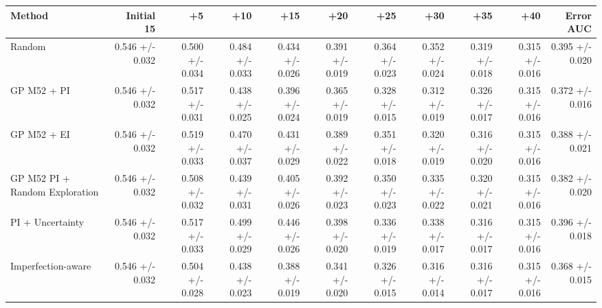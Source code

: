 \begin{tabular}{lrrrrrrrrrr}
\toprule
Method & Initial 15 & +5 & +10 & +15 & +20 & +25 & +30 & +35 & +40 & Error AUC \\
\midrule
Random & 0.546 +/- 0.032 & 0.500 +/- 0.034 & 0.484 +/- 0.033 & 0.434 +/- 0.026 & 0.391 +/- 0.019 & 0.364 +/- 0.023 & 0.352 +/- 0.024 & 0.319 +/- 0.018 & 0.315 +/- 0.016 & 0.395 +/- 0.020 \\
GP M52 + PI & 0.546 +/- 0.032 & 0.517 +/- 0.031 & 0.438 +/- 0.025 & 0.396 +/- 0.024 & 0.365 +/- 0.019 & 0.328 +/- 0.015 & 0.312 +/- 0.019 & 0.326 +/- 0.017 & 0.315 +/- 0.016 & 0.372 +/- 0.016 \\
GP M52 + EI & 0.546 +/- 0.032 & 0.519 +/- 0.033 & 0.470 +/- 0.037 & 0.431 +/- 0.029 & 0.389 +/- 0.022 & 0.351 +/- 0.018 & 0.320 +/- 0.019 & 0.316 +/- 0.020 & 0.315 +/- 0.016 & 0.388 +/- 0.021 \\
GP M52 PI + Random Exploration & 0.546 +/- 0.032 & 0.508 +/- 0.032 & 0.439 +/- 0.031 & 0.405 +/- 0.026 & 0.392 +/- 0.023 & 0.350 +/- 0.023 & 0.335 +/- 0.022 & 0.320 +/- 0.021 & 0.315 +/- 0.016 & 0.382 +/- 0.020 \\
PI + Uncertainty & 0.546 +/- 0.032 & 0.517 +/- 0.033 & 0.499 +/- 0.029 & 0.446 +/- 0.026 & 0.398 +/- 0.020 & 0.336 +/- 0.019 & 0.338 +/- 0.017 & 0.316 +/- 0.017 & 0.315 +/- 0.016 & 0.396 +/- 0.018 \\
Imperfection-aware & 0.546 +/- 0.032 & 0.504 +/- 0.028 & 0.438 +/- 0.023 & 0.388 +/- 0.019 & 0.341 +/- 0.020 & 0.326 +/- 0.015 & 0.316 +/- 0.014 & 0.316 +/- 0.017 & 0.315 +/- 0.016 & 0.368 +/- 0.015 \\
\bottomrule
\end{tabular}
